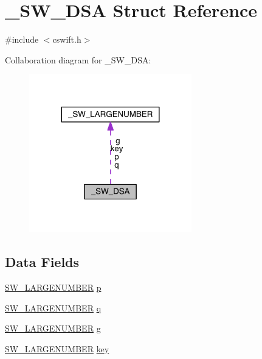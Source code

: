 \hypertarget{struct___s_w___d_s_a}{}\section{\+\_\+\+S\+W\+\_\+\+D\+SA Struct Reference}
\label{struct___s_w___d_s_a}


{\ttfamily \#include $<$cswift.\+h$>$}



Collaboration diagram for \+\_\+\+S\+W\+\_\+\+D\+SA\+:\nopagebreak
\begin{figure}[H]
\begin{center}
\leavevmode
\includegraphics[width=200pt]{struct___s_w___d_s_a__coll__graph}
\end{center}
\end{figure}
\subsection*{Data Fields}
\begin{DoxyCompactItemize}
\item 
\hyperlink{cswift_8h_aace52592ab28d0cb89b2ede5e864d859}{S\+W\+\_\+\+L\+A\+R\+G\+E\+N\+U\+M\+B\+ER} \hyperlink{struct___s_w___d_s_a_a60e95aa3174f6d5deec9af8e31301f90}{p}
\item 
\hyperlink{cswift_8h_aace52592ab28d0cb89b2ede5e864d859}{S\+W\+\_\+\+L\+A\+R\+G\+E\+N\+U\+M\+B\+ER} \hyperlink{struct___s_w___d_s_a_a21ddbe8b788924d70fb99345656604bb}{q}
\item 
\hyperlink{cswift_8h_aace52592ab28d0cb89b2ede5e864d859}{S\+W\+\_\+\+L\+A\+R\+G\+E\+N\+U\+M\+B\+ER} \hyperlink{struct___s_w___d_s_a_aa800be97875810b0c9d036903ee51073}{g}
\item 
\hyperlink{cswift_8h_aace52592ab28d0cb89b2ede5e864d859}{S\+W\+\_\+\+L\+A\+R\+G\+E\+N\+U\+M\+B\+ER} \hyperlink{struct___s_w___d_s_a_a8e86c13d40d9291b46e5a335bee60d84}{key}
\end{DoxyCompactItemize}


